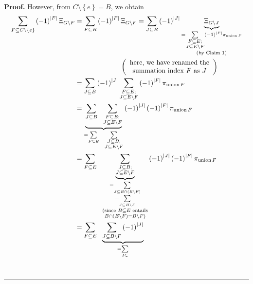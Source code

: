 \documentclass[numbers=enddot,12pt,final,onecolumn,notitlepage]{scrartcl}%
\theoremstyle{definition}
\newenvironment{proof}[1][Proof]{\noindent\textbf{#1.} }{\ \rule{0.5em}{0.5em}}
\newenvironment{vershort}{}{}
\let\sumnonlimits\sum
\renewcommand{\sum}{\sumnonlimits\limits}
\begin{document}
\begin{proof}
\begin{vershort}
However, from $C\setminus\left\{  e\right\}  =B$, we obtain%
\begin{align}
\sum_{F\subseteq C\setminus\left\{  e\right\}  }\left(  -1\right)
^{\left\vert F\right\vert }\Xi_{G\setminus F}  &  =\sum_{F\subseteq B}\left(
-1\right)  ^{\left\vert F\right\vert }\Xi_{G\setminus F}=\sum_{J\subseteq
B}\left(  -1\right)  ^{\left\vert J\right\vert }\underbrace{\Xi_{G\setminus
J}}_{\substack{=\sum_{\substack{F\subseteq E;\\J\subseteq E\setminus
F}}\left(  -1\right)  ^{\left\vert F\right\vert }\pi_{\operatorname*{union}%
F}\\\text{(by Claim 1)}}}\nonumber\\
&  \ \ \ \ \ \ \ \ \ \ \ \ \ \ \ \ \ \ \ \ \left(
\begin{array}
[c]{c}%
\text{here, we have renamed the}\\
\text{summation index }F\text{ as }J
\end{array}
\right) \nonumber\\
&  =\sum_{J\subseteq B}\left(  -1\right)  ^{\left\vert J\right\vert }%
\sum_{\substack{F\subseteq E;\\J\subseteq E\setminus F}}\left(  -1\right)
^{\left\vert F\right\vert }\pi_{\operatorname*{union}F}\nonumber\\
&  =\underbrace{\sum_{J\subseteq B}\ \ \sum_{\substack{F\subseteq
E;\\J\subseteq E\setminus F}}}_{=\sum_{F\subseteq E}\ \ \sum
_{\substack{J\subseteq B;\\J\subseteq E\setminus F}}}\left(  -1\right)
^{\left\vert J\right\vert }\left(  -1\right)  ^{\left\vert F\right\vert }%
\pi_{\operatorname*{union}F}\nonumber\\
&  =\sum_{F\subseteq E}\ \ \underbrace{\sum_{\substack{J\subseteq
B;\\J\subseteq E\setminus F}}}_{\substack{=\sum_{J\subseteq B\cap\left(
E\setminus F\right)  }\\=\sum_{J\subseteq B\setminus F}\\\text{(since
}B\subseteq E\text{ entails}\\B\cap\left(  E\setminus F\right)  =B\setminus
F\text{)}}}\left(  -1\right)  ^{\left\vert J\right\vert }\left(  -1\right)
^{\left\vert F\right\vert }\pi_{\operatorname*{union}F}\nonumber\\
&  =\sum_{F\subseteq E}\ \ \underbrace{\sum_{J\subseteq B\setminus F}\left(
-1\right)  ^{\left\vert J\right\vert }}_{\substack{=\sum_{I\subseteq
}}}
\end{align}
\end{vershort}
\end{proof}
\end{document}
